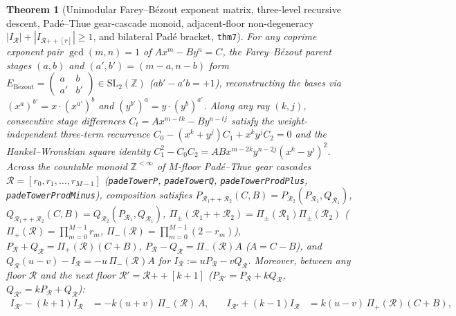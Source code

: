 \documentclass[11pt,a4paper]{article}
\theoremstyle{plain}
\newtheorem{theorem}{Theorem}[section]
\theoremstyle{definition}
\begin{document}
\begin{theorem}[Unimodular Farey--B\'ezout exponent matrix, three-level recursive descent, Pad\'e--Thue gear-cascade monoid, adjacent-floor non-degeneracy $|I_{\mathcal{R}}| + |I_{\mathcal{R}\mathbin{+\!+}[r]}| \ge 1$, and bilateral Pad\'e bracket, \texttt{thm7}]
\label{thm:main-7}
For any coprime exponent pair $\gcd(m,n)=1$ of $A x^m - B y^n = C$, the Farey--B\'ezout parent stages $(a,b)$ and $(a',b') = (m-a,n-b)$ form $E_{\mathrm{B\acute{e}zout}} = \begin{pmatrix} a & b \\ a' & b' \end{pmatrix}\in\mathrm{SL}_2(\mathbb{Z})$ ($a b' - a' b = +1$), reconstructing the bases via $(x^a)^{b'} = x\cdot (x^{a'})^b$ and $(y^{b'})^a = y\cdot (y^b)^{a'}$. Along any ray $(k,j)$, consecutive stage differences $C_t = A x^{m-tk} - B y^{n-tj}$ satisfy the weight-independent three-term recurrence $C_0 - (x^k+y^j)C_1 + x^k y^j C_2 = 0$ and the Hankel--Wronskian square identity $C_1^2 - C_0 C_2 = A B x^{m-2k}y^{n-2j}(x^k-y^j)^2$. Across the countable monoid $\mathbb{Z}^{<\infty}$ of $M$-floor Pad\'e--Thue gear cascades $\mathcal{R} = [r_0,r_1,\dots,r_{M-1}]$ (\texttt{padeTowerP}, \texttt{padeTowerQ}, \texttt{padeTowerProdPlus}, \texttt{padeTowerProdMinus}), composition satisfies $P_{\mathcal{R}_1\mathbin{+\!+}\mathcal{R}_2}(C,B) = P_{\mathcal{R}_2}(P_{\mathcal{R}_1},Q_{\mathcal{R}_1})$, $Q_{\mathcal{R}_1\mathbin{+\!+}\mathcal{R}_2}(C,B) = Q_{\mathcal{R}_2}(P_{\mathcal{R}_1},Q_{\mathcal{R}_1})$, $\Pi_\pm(\mathcal{R}_1\mathbin{+\!+}\mathcal{R}_2) = \Pi_\pm(\mathcal{R}_1)\Pi_\pm(\mathcal{R}_2)$ ($\Pi_+(\mathcal{R})=\prod_{m=0}^{M-1}r_m$, $\Pi_-(\mathcal{R})=\prod_{m=0}^{M-1}(2-r_m)$), $P_{\mathcal{R}}+Q_{\mathcal{R}} = \Pi_+(\mathcal{R})(C+B)$, $P_{\mathcal{R}}-Q_{\mathcal{R}} = \Pi_-(\mathcal{R})A$ ($A = C - B$), and $Q_{\mathcal{R}}(u-v) - I_{\mathcal{R}} = -u\,\Pi_-(\mathcal{R})A$ for $I_{\mathcal{R}} := u P_{\mathcal{R}} - v Q_{\mathcal{R}}$. Moreover, between any floor $\mathcal{R}$ and the next floor $\mathcal{R}' = \mathcal{R}\mathbin{+\!+}[k+1]$ ($P_{\mathcal{R}'} = P_{\mathcal{R}} + k Q_{\mathcal{R}}$, $Q_{\mathcal{R}'} = k P_{\mathcal{R}} + Q_{\mathcal{R}}$):
\begin{equation}
  \label{eq:adjacent-pade-wronskian}
  \begin{aligned}
    I_{\mathcal{R}'} - (k+1)I_{\mathcal{R}} &= -k(u+v)\,\Pi_-(\mathcal{R})\,A, &\quad
    I_{\mathcal{R}'} + (k-1)I_{\mathcal{R}} &= k(u-v)\,\Pi_+(\mathcal{R})(C+B), \\

\end{aligned}
\end{equation}
\end{theorem}
\end{document}
